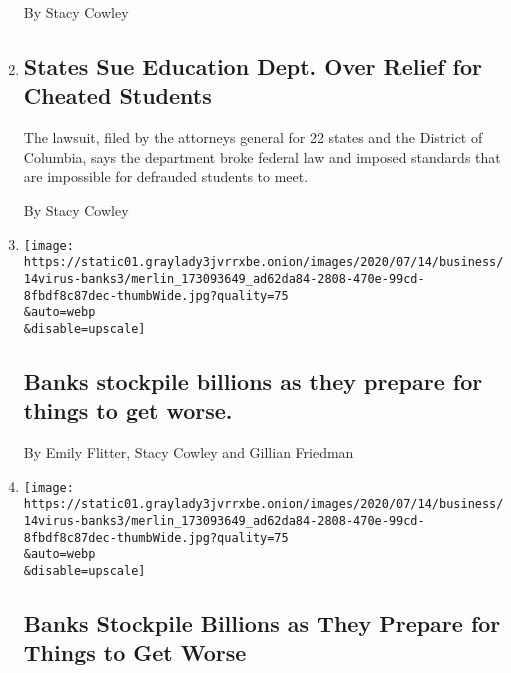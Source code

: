 \begin{enumerate}
  By Stacy Cowley
\item
  \href{/2020/07/15/business/student-loans-education-department-betsy-devos.html}{}

  \hypertarget{states-sue-education-dept-over-relief-for-cheated-students}{%
  \subsection{States Sue Education Dept. Over Relief for Cheated
  Students}\label{states-sue-education-dept-over-relief-for-cheated-students}}

  The lawsuit, filed by the attorneys general for 22 states and the
  District of Columbia, says the department broke federal law and
  imposed standards that are impossible for defrauded students to meet.

  By Stacy Cowley
\item
  \href{/live/2020/07/14/business/stock-market-updates-coronavirus/banks-stockpile-billions-as-they-prepare-for-things-to-get-worse}{}

  \texttt{[image: https://static01.graylady3jvrrxbe.onion/images/2020/07/14/business/14virus-banks3/merlin\_173093649\_ad62da84-2808-470e-99cd-8fbdf8c87dec-thumbWide.jpg?quality=75\\\&auto=webp\\\&disable=upscale]}

  \hypertarget{banks-stockpile-billions-as-they-prepare-for-things-to-get-worse}{%
  \subsection{Banks stockpile billions as they prepare for things to get
  worse.}\label{banks-stockpile-billions-as-they-prepare-for-things-to-get-worse}}

  By Emily Flitter, Stacy Cowley and Gillian Friedman
\item
  \href{/2020/07/14/business/big-banks-quarterly-results.html}{}

  \texttt{[image: https://static01.graylady3jvrrxbe.onion/images/2020/07/14/business/14virus-banks3/merlin\_173093649\_ad62da84-2808-470e-99cd-8fbdf8c87dec-thumbWide.jpg?quality=75\\\&auto=webp\\\&disable=upscale]}

  \hypertarget{banks-stockpile-billions-as-they-prepare-for-things-to-get-worse-1}{%
  \subsection{Banks Stockpile Billions as They Prepare for Things to Get
  Worse}\label{banks-stockpile-billions-as-they-prepare-for-things-to-get-worse-1}}


\end{enumerate}
